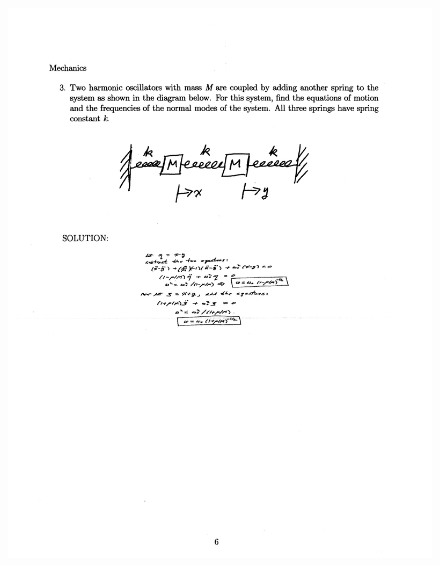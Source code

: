 \documentclass[10pt,a4paper]{article}
\begin{document}
 \newpage
\begin{figure}[H]
 \centering
 \includegraphics[width=16cm]{pdf/1-1T27.png}
\end{figure}
 \newpage
\end{document}
